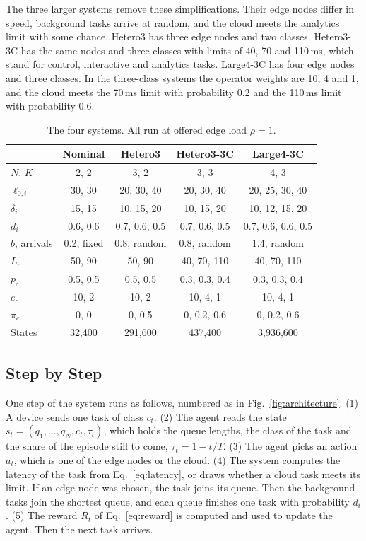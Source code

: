 \documentclass[journal]{IEEEtran}
\begin{document}
The three larger systems remove these simplifications. Their edge nodes differ in speed, background tasks arrive at random, and the cloud meets the analytics limit with some chance. Hetero3 has three edge nodes and two classes. Hetero3-3C has the same nodes and three classes with limits of 40, 70 and 110\,ms, which stand for control, interactive and analytics tasks. Large4-3C has four edge nodes and three classes. In the three-class systems the operator weights are 10, 4 and 1, and the cloud meets the 70\,ms limit with probability 0.2 and the 110\,ms limit with probability 0.6.

\begin{table}[t]
\caption{The four systems. All run at offered edge load $\rho=1$.}
\label{tab:systems}
\centering
\footnotesize
\setlength{\tabcolsep}{2.5pt}
\begin{tabular}{@{}lcccc@{}}
\toprule
 & Nominal & Hetero3 & Hetero3-3C & Large4-3C \\
\midrule
$N$, $K$ & 2, 2 & 3, 2 & 3, 3 & 4, 3 \\
$\ell_{0,i}$ & 30, 30 & 20, 30, 40 & 20, 30, 40 & 20, 25, 30, 40 \\
$\delta_i$ & 15, 15 & 10, 15, 20 & 10, 15, 20 & 10, 12, 15, 20 \\
$d_i$ & 0.6, 0.6 & 0.7, 0.6, 0.5 & 0.7, 0.6, 0.5 & 0.7, 0.6, 0.6, 0.5 \\
$b$, arrivals & 0.2, fixed & 0.8, random & 0.8, random & 1.4, random \\
$L_c$ & 50, 90 & 50, 90 & 40, 70, 110 & 40, 70, 110 \\
$p_c$ & 0.5, 0.5 & 0.5, 0.5 & 0.3, 0.3, 0.4 & 0.3, 0.3, 0.4 \\
$e_c$ & 10, 2 & 10, 2 & 10, 4, 1 & 10, 4, 1 \\
$\pi_c$ & 0, 0 & 0, 0.5 & 0, 0.2, 0.6 & 0, 0.2, 0.6 \\
States & 32,400 & 291,600 & 437,400 & 3,936,600 \\
\bottomrule
\end{tabular}
\end{table}

\subsection{Step by Step}
\label{sec:steps}
One step of the system runs as follows, numbered as in Fig.~\ref{fig:architecture}. (1) A device sends one task of class $c_t$. (2) The agent reads the state $s_t = (q_1,\dots,q_N, c_t, \tau_t)$, which holds the queue lengths, the class of the task and the share of the episode still to come, $\tau_t = 1 - t/T$. (3) The agent picks an action $a_t$, which is one of the edge nodes or the cloud. (4) The system computes the latency of the task from Eq.~\eqref{eq:latency}, or draws whether a cloud task meets its limit. If an edge node was chosen, the task joins its queue. Then the background tasks join the shortest queue, and each queue finishes one task with probability $d_i$. (5) The reward $R_t$ of Eq.~\eqref{eq:reward} is computed and used to update the agent. Then the next task arrives.
\end{document}
